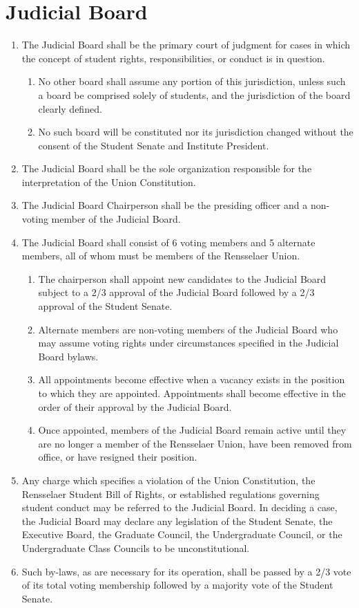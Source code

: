 \documentclass{uniondoc}
\begin{document}
\section{Judicial Board}

\begin{enumerate}
	\item The Judicial Board shall be the primary court of judgment for cases in which the concept of student rights, responsibilities, or conduct is in question.
	      \begin{enumerate}
		      \item No other board shall assume any portion of this jurisdiction, unless such a board be comprised solely of students, and the jurisdiction of the board clearly defined.
		      \item No such board will be constituted nor its jurisdiction changed without the consent of the Student Senate and Institute President.
	      \end{enumerate}
	\item The Judicial Board shall be the sole organization responsible for the interpretation of the Union Constitution.
	\item The Judicial Board Chairperson shall be the presiding officer and a non-voting member of the Judicial Board.
	\item The Judicial Board shall consist of 6 voting members and 5 alternate members, all of whom must be members of the Rensselaer Union.
	      \begin{enumerate}
		      \item The chairperson shall appoint new candidates to the Judicial Board subject to a 2/3 approval of the Judicial Board followed by a 2/3 approval of the Student Senate.
		      \item Alternate members are non-voting members of the Judicial Board who may assume voting rights under circumstances specified in the Judicial Board bylaws.
		      \item All appointments become effective when a vacancy exists in the position to which they are appointed. Appointments shall become effective in the order of their approval by the Judicial Board.
		      \item Once appointed, members of the Judicial Board remain active until they are no longer a member of the Rensselaer Union, have been removed from office, or have resigned their position.
	      \end{enumerate}
	\item Any charge which specifies a violation of the Union Constitution, the Rensselaer Student Bill of Rights, or established regulations governing student conduct may be referred to the Judicial Board. In deciding a case, the Judicial Board may declare any legislation of the Student Senate, the Executive Board, the Graduate Council, the Undergraduate Council, or the Undergraduate Class Councils to be unconstitutional.
	\item Such by-laws, as are necessary for its operation, shall be passed by a 2/3 vote of its total voting membership followed by a majority vote of the Student Senate.
\end{enumerate}
\end{document}
